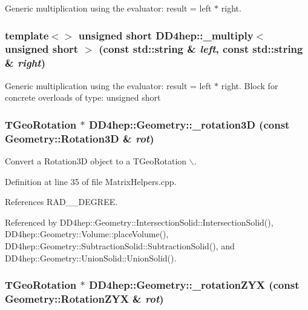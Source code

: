 Generic multiplication using the evaluator: result = left $\ast$ right. \hypertarget{group___d_d4_h_e_p___g_e_o_m_e_t_r_y_ga6482dc630996278ced2ba26265fa93be}{
\subsubsection[{\_\-multiply$<$ unsigned short $>$}]{\setlength{\rightskip}{0pt plus 5cm}template$<$$>$ unsigned short DD4hep::\_\-multiply$<$ unsigned short $>$ (const std::string \& {\em left}, \/  const std::string \& {\em right})}}
\label{group___d_d4_h_e_p___g_e_o_m_e_t_r_y_ga6482dc630996278ced2ba26265fa93be}


Generic multiplication using the evaluator: result = left $\ast$ right. Block for concrete overloads of type: unsigned short \hypertarget{group___d_d4_h_e_p___g_e_o_m_e_t_r_y_ga1dc4cc8b92d11d2fc874ed142c7b1bbc}{
\subsubsection[{\_\-rotation3D}]{\setlength{\rightskip}{0pt plus 5cm}TGeoRotation $\ast$ DD4hep::Geometry::\_\-rotation3D (const Geometry::Rotation3D \& {\em rot})}}
\label{group___d_d4_h_e_p___g_e_o_m_e_t_r_y_ga1dc4cc8b92d11d2fc874ed142c7b1bbc}


Convert a Rotation3D object to a TGeoRotation $\backslash$. 

Definition at line 35 of file MatrixHelpers.cpp.

References RAD\_\_\-DEGREE.

Referenced by DD4hep::Geometry::IntersectionSolid::IntersectionSolid(), DD4hep::Geometry::Volume::placeVolume(), DD4hep::Geometry::SubtractionSolid::SubtractionSolid(), and DD4hep::Geometry::UnionSolid::UnionSolid().\hypertarget{group___d_d4_h_e_p___g_e_o_m_e_t_r_y_gac468c0a81631e0a1c052094131f9d680}{
\subsubsection[{\_\-rotationZYX}]{\setlength{\rightskip}{0pt plus 5cm}TGeoRotation $\ast$ DD4hep::Geometry::\_\-rotationZYX (const Geometry::RotationZYX \& {\em rot})}}
\label{group___d_d4_h_e_p___g_e_o_m_e_t_r_y_gac468c0a81631e0a1c052094131f9d680}


